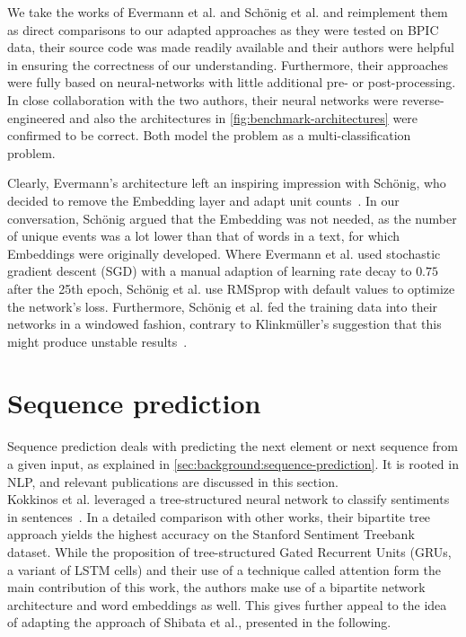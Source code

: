 We take the works of Evermann et al. and Schönig et al. and reimplement them as direct comparisons to our adapted approaches as they were tested on BPIC data, their source code was made readily available and their authors were helpful in ensuring the correctness of our understanding. Furthermore, their approaches were fully based on neural-networks with little additional pre- or post-processing. In close collaboration with the two authors, their neural networks were reverse-engineered and also the architectures in \autoref{fig:benchmark-architectures} were confirmed to be correct. Both model the problem as a multi-classification problem.

Clearly, Evermann's architecture left an inspiring impression with Schönig, who decided to remove the Embedding layer and adapt unit counts~\cite{schoenig2018}. In our conversation, Schönig argued that the Embedding was not needed, as the number of unique events was a lot lower than that of words in a text, for which Embeddings were originally developed. Where Evermann et al. used stochastic gradient descent (SGD) with a manual adaption of learning rate decay to $0.75$ after the 25th epoch, Schönig et al. use RMSprop with default values to optimize the network's loss. Furthermore, Schönig et al. fed the training data into their networks in a windowed fashion, contrary to Klinkmüller's suggestion that this might produce unstable results~\cite{klinkmuller2018reliablemonitoring}.

\section{Sequence prediction}\label{sec:related-work-sequence-prediction}
Sequence prediction deals with predicting the next element or next sequence from a given input, as explained in \autoref{sec:background:sequence-prediction}. It is rooted in NLP, and relevant publications are discussed in this section.\\

Kokkinos et al. leveraged a tree-structured neural network to classify sentiments in sentences~\cite{kokkinos2017structural}. In a detailed comparison with other works, their bipartite tree approach yields the highest accuracy on the Stanford Sentiment Treebank dataset. While the proposition of tree-structured Gated Recurrent Units (GRUs, a variant of LSTM cells) and their use of a technique called attention form the main contribution of this work, the authors make use of a bipartite network architecture and word embeddings as well. This gives further appeal to the idea of adapting the approach of Shibata et al., presented in the following.\\

